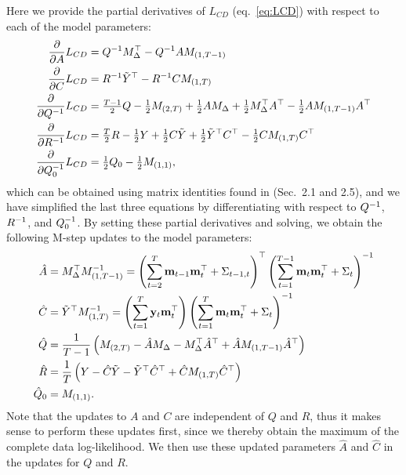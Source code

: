 \documentclass[10pt]{article}
\newcommand{\vy}{\mathbf{y}}
\newcommand{\vm}{\mathbf{m}}
\begin{document}
Here we provide the partial derivatives of $L_{CD}$ (eq.~\ref{eq:LCD}) with respect to
each of the model parameters: 
\begin{align}
  \label{eq:dLdA}
  \frac{\partial }{\partial A} L_{CD}&= Q ^{-1} M_\Delta ^\top - Q^{-1} A   M_{(1,T-1)} \\
  \frac{\partial }{\partial C} L_{CD}&= R ^{-1} \tilde Y^\top - R^{-1} C   M_{(1,T)} \\
  \frac{\partial }{\partial Q^{-1}} L_{CD}&= \tfrac{T-1}{2} Q  -
                                           \tfrac{1}{2} M_{(2,T)}
                                           +\tfrac{1}{2}  A M_\Delta
                                           +\tfrac{1}{2} M_\Delta ^\top A ^\top
                                           -\tfrac{1}{2} A  M_{(1,T-1)} A^\top \\
  \frac{\partial }{\partial R^{-1}} L_{CD}&= \tfrac{T}{2} R  -
                                           \tfrac{1}{2} Y
                                           +\tfrac{1}{2}  C \tilde Y
                                           +\tfrac{1}{2} \tilde Y^\top C^\top
                                           -\tfrac{1}{2} C  M_{(1,T)}C^\top
  \\
 \label{eq:dLdQ0} 
 \frac{\partial}{\partial Q_0^{-1}} L_{CD} &=  \tfrac{1}{2} Q_0 -
                                             \tfrac{1}{2} M_{(1,1)}, 
\end{align}
which can be obtained using matrix identities found in
\citep{matrixcookbook} (Sec.~2.1 and 2.5), and we have simplified the
last three equations by differentiating with respect to $Q^{-1}$,
$R^{-1}$, and $Q_0^{-1}$.  By setting these partial derivatives and
solving, we obtain the following M-step updates to the model
parameters:
\begin{align}
  \label{eq:mstepa}
  \hat A &= M_\Delta \trp  M_{(1,T-1)}\inv = \left(\sum_{t=2}^{T}
           \vm_{t-1} \vm_{t}\trp + \Sigma_{t-1,t}\right)\trp \left(    \sum_{t=1}^{T-1} \vm_t \vm_{t}\trp + \Sigma_{t} \right)\inv
  \\
  \hat C &= \tilde Y\trp { M^{-1}_{(1,T)}}
           = \left( \sum_{t=1}^{T} \vy_t \vm_{t}\trp  \right)  \left(
           \sum_{t=1}^{T} \vm_t \vm_{t}\trp + \Sigma_{t}\right) \inv
  \\
  \hat Q &= \frac{1}{T-1} \left(  M_{(2,T)}
                                           -  \hat A  M_\Delta
                                           - M_\Delta \trp \hat A\trp
                                           + \hat A  M_{(1,T-1)} \hat A\trp  \right)  \\
  \hat R &= \frac{1}{T} \left(  Y
                                           -  \hat C \tilde Y
                                           - \tilde Y\trp \hat C\trp
                                           + \hat C  M_{(1,T)} \hat C\trp
           \right) \\
  \label{eq:mstepq0}
  \hat Q_0 &= M_{(1,1)}.
\end{align}
Note that the updates to $A$ and $C$ are independent of $Q$ and $R$, thus it makes sense to perform these updates first, since we thereby obtain the maximum of the complete data  log-likelihood.  We then use these updated parameters $\hat A$ and $\hat C$ in the updates for $Q$ and $R$.  
\end{document}
